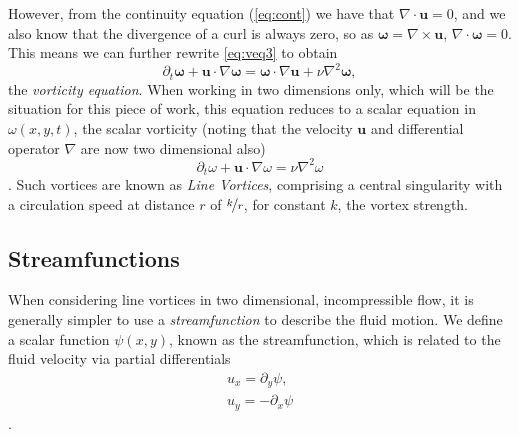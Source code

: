 \documentclass[10pt, a4paper]{article}
\numberwithin{equation}{section}
\newcommand{\vel}{\bm{u}}
\newcommand{\del}{\nabla}
\newcommand{\deldot}{\nabla \cdot}
\newcommand{\delcross}{\nabla \times}
\newcommand{\bo}{\bm{\omega}}
\begin{document}
However, from the continuity equation (\cref{eq:cont}) we have that $\deldot\vel=0$, and we also know that the divergence of a curl is always zero, so as $\bo=\delcross\vel$, $\deldot\bo=0$.
This means we can further rewrite \cref{eq:veq3} to obtain
\begin{equation}
\partial_t \bo + \vel\cdot \del\bo = \bo \cdot \del\vel + \nu \del^2 \bo,
\label{eq:veq4}
\end{equation}
the \emph{vorticity equation}.
When working in two dimensions only, which will be the situation for this piece of work, this equation reduces to a scalar equation in $\omega(x,y,t)$, the scalar vorticity (noting that the velocity $\vel$ and differential operator $\del$ are now two dimensional also)
\begin{equation}
\partial_t \omega + \vel \cdot \del \omega = \nu \del^2 \omega
\label{eq:2dveq}
\end{equation}
\citep{wayne11}.
Such vortices are known as \emph{Line Vortices}, comprising a central singularity with a circulation speed at distance $r$ of $\nicefrac{k}{r}$, for constant $k$, the vortex strength.
\subsection{Streamfunctions}
When considering line vortices in two dimensional, incompressible flow, it is generally simpler to use a \emph{streamfunction} to describe the fluid motion. 
We define a scalar function $\psi(x,y)$, known as the streamfunction, which is related to the fluid velocity via partial differentials
\begin{align}
\label{eq:sf1}
u_x=\partial_y \psi,\\
\label{eq:sf2}
u_y=-\partial_x \psi
\end{align}
\citep{harlen14c1}.
\end{document}
